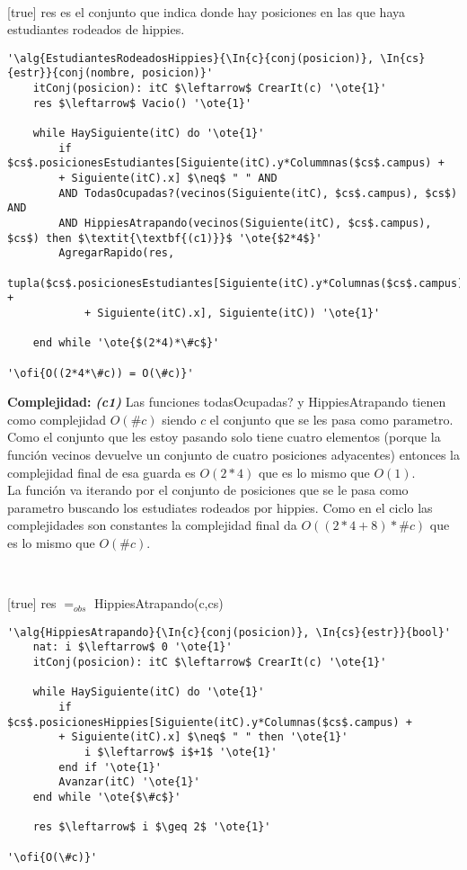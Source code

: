 ~


[true]
{res es el conjunto que indica donde hay posiciones en las que haya estudiantes rodeados de hippies.}

\begin{lstlisting}[mathescape]
'\alg{EstudiantesRodeadosHippies}{\In{c}{conj(posicion)}, \In{cs}{estr}}{conj(nombre, posicion)}'
	itConj(posicion): itC $\leftarrow$ CrearIt(c) '\ote{1}'
	res $\leftarrow$ Vacio() '\ote{1}'

	while HaySiguiente(itC) do '\ote{1}'
		if $cs$.posicionesEstudiantes[Siguiente(itC).y*Colummnas($cs$.campus) +
		+ Siguiente(itC).x] $\neq$ " " AND
		AND TodasOcupadas?(vecinos(Siguiente(itC), $cs$.campus), $cs$) AND
		AND HippiesAtrapando(vecinos(Siguiente(itC), $cs$.campus), $cs$) then $\textit{\textbf{(c1)}}$ '\ote{$2*4$}'
		AgregarRapido(res,
			tupla($cs$.posicionesEstudiantes[Siguiente(itC).y*Columnas($cs$.campus) +
			+ Siguiente(itC).x], Siguiente(itC)) '\ote{1}'

	end while '\ote{$(2*4)*\#c$}'

'\ofi{O((2*4*\#c)) = O(\#c)}'
\end{lstlisting}

\textbf{Complejidad:} \textit{\textbf{(c1)}} Las funciones todasOcupadas? y HippiesAtrapando tienen como complejidad $O(\#c)$ siendo $c$ el conjunto que se les pasa como parametro. Como el conjunto que les estoy pasando solo tiene cuatro elementos (porque la función vecinos devuelve un conjunto de cuatro posiciones adyacentes) entonces la complejidad final de esa guarda es $O(2*4)$ que es lo mismo que $O(1)$. \\
La función va iterando por el conjunto de posiciones que se le pasa como parametro buscando los estudiates rodeados por hippies. Como en el ciclo las complejidades son constantes la complejidad final da $O((2*4+8)*\#c)$ que es lo mismo que $O(\#c)$.


~


[true]
{res $=_{obs}$ HippiesAtrapando(c,cs)}

\begin{lstlisting}[mathescape]
'\alg{HippiesAtrapando}{\In{c}{conj(posicion)}, \In{cs}{estr}}{bool}'
	nat: i $\leftarrow$ 0 '\ote{1}'
	itConj(posicion): itC $\leftarrow$ CrearIt(c) '\ote{1}'

	while HaySiguiente(itC) do '\ote{1}'
		if $cs$.posicionesHippies[Siguiente(itC).y*Columnas($cs$.campus) +
		+ Siguiente(itC).x] $\neq$ " " then '\ote{1}'
			i $\leftarrow$ i$+1$ '\ote{1}'
		end if '\ote{1}'
		Avanzar(itC) '\ote{1}'
	end while '\ote{$\#c$}'

	res $\leftarrow$ i $\geq 2$ '\ote{1}'

'\ofi{O(\#c)}'
\end{lstlisting}

